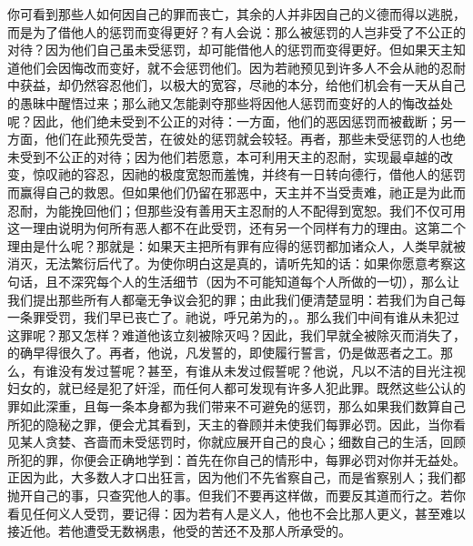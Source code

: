你可看到那些人如何因自己的罪而丧亡，其余的人并非因自己的义德而得以逃脱，而是为了借他人的惩罚而变得更好？有人会说：那么被惩罚的人岂非受了不公正的对待？因为他们自己虽未受惩罚，却可能借他人的惩罚而变得更好。但如果天主知道他们会因悔改而变好，就不会惩罚他们。因为若祂预见到许多人不会从祂的忍耐中获益，却仍然容忍他们，以极大的宽容，尽祂的本分，给他们机会有一天从自己的愚昧中醒悟过来；那么祂又怎能剥夺那些将因他人惩罚而变好的人的悔改益处呢？因此，他们绝未受到不公正的对待：一方面，他们的恶因惩罚而被截断；另一方面，他们在此预先受苦，在彼处的惩罚就会较轻。再者，那些未受惩罚的人也绝未受到不公正的对待；因为他们若愿意，本可利用天主的忍耐，实现最卓越的改变，惊叹祂的容忍，因祂的极度宽恕而羞愧，并终有一日转向德行，借他人的惩罚而赢得自己的救恩。但如果他们仍留在邪恶中，天主并不当受责难，祂正是为此而忍耐，为能挽回他们；但那些没有善用天主忍耐的人不配得到宽恕。我们不仅可用这一理由说明为何所有恶人都不在此受罚，还有另一个同样有力的理由。这第二个理由是什么呢？那就是：如果天主把所有罪有应得的惩罚都加诸众人，人类早就被消灭，无法繁衍后代了。为使你明白这是真的，请听先知的话：如果你愿意考察这句话，且不深究每个人的生活细节（因为不可能知道每个人所做的一切），那么让我们提出那些所有人都毫无争议会犯的罪；由此我们便清楚显明：若我们为自己每一条罪受罚，我们早已丧亡了。祂说，呼兄弟为的，。那么我们中间有谁从未犯过这罪呢？那又怎样？难道他该立刻被除灭吗？因此，我们早就全被除灭而消失了，的确早得很久了。再者，他说，凡发誓的，即使履行誓言，仍是做恶者之工。那么，有谁没有发过誓呢？甚至，有谁从未发过假誓呢？他说，凡以不洁的目光注视妇女的，就已经是犯了奸淫，而任何人都可发现有许多人犯此罪。既然这些公认的罪如此深重，且每一条本身都为我们带来不可避免的惩罚，那么如果我们数算自己所犯的隐秘之罪，便会尤其看到，天主的眷顾并未使我们每罪必罚。因此，当你看见某人贪婪、吝啬而未受惩罚时，你就应展开自己的良心；细数自己的生活，回顾所犯的罪，你便会正确地学到：首先在你自己的情形中，每罪必罚对你并无益处。正因为此，大多数人才口出狂言，因为他们不先省察自己，而是省察别人；我们都抛开自己的事，只查究他人的事。但我们不要再这样做，而要反其道而行之。若你看见任何义人受罚，要记得：因为若有人是义人，他也不会比那人更义，甚至难以接近他。若他遭受无数祸患，他受的苦还不及那人所承受的。\par

